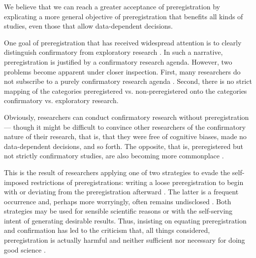\documentclass[jou,a4paper]{apa7}
\begin{document}
We believe that we can reach a greater acceptance of preregistration by explicating a more general objective of preregistration that benefits all kinds of studies, even those that allow data-dependent decisions.\par
One goal of preregistration that has received widespread attention is to clearly distinguish confirmatory from exploratory research \parencite{mellorEasyPreregistrationWill2018, mellorEasyPreregistrationWill2018, nosekPreregistrationRevolution2018, wagenmakersAgendaPurelyConfirmatory2012, simmonsPreregistrationWhyHow2021, bakkerEnsuringQualitySpecificity2020}.
In such a narrative, preregistration is justified by a confirmatory research agenda. However, two problems become apparent under closer inspection. First, many researchers do not subscribe to a purely confirmatory research agenda \parencite{tukeyExploratoryDataAnalysis1972,baumeisterChartingFutureSocial2016,finkelReplicabilityOtherFeatures2017, brandmaierStructuralEquationModel2013}.
Second, there is no strict mapping of the categories preregistered vs. non-preregistered onto the categories confirmatory vs. exploratory research.\par
Obviously, researchers can conduct confirmatory research without preregistration — though it might be difficult to convince other researchers of the confirmatory nature of their research, that is, that they were free of cognitive biases, made no data-dependent decisions, and so forth.
The opposite, that is, preregistered but not strictly confirmatory studies, are also becoming more commonplace \parencite{dwanSystematicReviewEmpirical2008, chanEmpiricalEvidenceSelective2004, silagyPublishingProtocolsSystematic2002}.\par
This is the result of researchers applying one of two strategies to evade the self-imposed restrictions of preregistrations: writing a loose preregistration to begin with \parencite{stefanBigLittleLies2022} or deviating from the preregistration afterward \parencite{lakensDeviate2024}.
The latter is a frequent occurrence and, perhaps more worryingly, often remains undisclosed \parencite{akkerEffectivenessPreregistrationPsychology2023,claesenComparingDreamReality2021}.
Both strategies may be used for sensible scientific reasons or with the self-serving intent of generating desirable results.
Thus, insisting on equating preregistration and confirmation has led to the criticism that, all things considered, preregistration is actually harmful and neither sufficient nor necessary for doing good science \parencite{szollosiPreregistrationWorthwhile2020,phamPreregistrationNeitherSufficient2021}.\par
\end{document}
